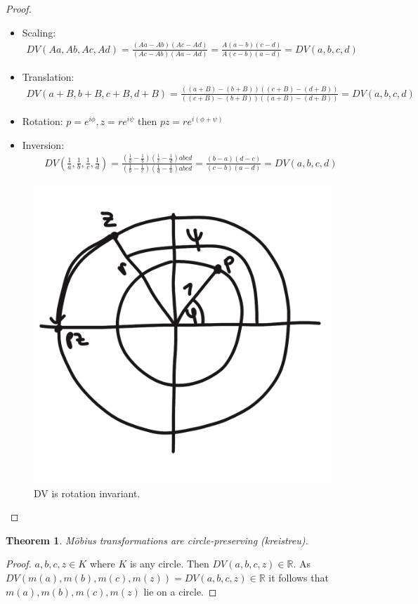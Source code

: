 \documentclass[]{article}
\newtheorem{theorem}{Theorem}
\begin{document}
\begin{proof}
	\begin{itemize}
		\item Scaling:
		\begin{align*}
			DV(Aa, Ab, Ac, Ad)= \frac{(Aa - Ab)(Ac - Ad)}{(Ac - Ab)(Aa - Ad)} = \frac{A(a-b)(c-d)}{A(c-b)(a-d)} = DV(a,b,c,d)
		\end{align*}
		\item Translation:
		\begin{align*}
			DV(a+B, b+B, c+B, d+B)= \frac{((a+B) - (b+B))((c+B) - (d+B))}{((c+B) - (b+B))((a+B) - (d+B))} = DV(a,b,c,d)
		\end{align*}
		\item Rotation: $p=e^{i\phi}, z=r e^{i\psi}$ then $pz=r e^{i(\phi+\psi)}$
		\item Inversion:
		\begin{align*}
			DV\left(\frac{1}{a}, \frac{1}{b}, \frac{1}{c}, \frac{1}{d}\right)= \frac{\left(\frac{1}{a} - \frac{1}{b}\right) \left(\frac{1}{c} - \frac{1}{d}\right) abcd}{\left(\frac{1}{b} - \frac{1}{c}\right) \left(\frac{1}{d} - \frac{1}{a}\right) abcd} = \frac{(b-a)(d-c)}{(c-b)(a-d)} = DV(a,b,c,d)
		\end{align*}
	\end{itemize}
	
	\begin{figure}[h!]
		\centering
		\includegraphics[width=0.3\linewidth]{figures/DV_rotation_invariant}
		\caption{DV is rotation invariant.}
		\label{fig:DV_rotation_invariant}
	\end{figure}
\end{proof}

\begin{theorem}
	Möbius transformations are circle-preserving (kreistreu).
\end{theorem}

\begin{proof}
	$a,b,c,z \in K$ where $K$ is any circle. Then $DV(a,b,c,z) \in \mathbb{R}$. As $DV(m(a), m(b), m(c), m(z)) = DV(a,b,c,z) \in \mathbb{R}$ it follows that $m(a), m(b), m(c), m(z)$ lie on a circle.
\end{proof}
\end{document}
